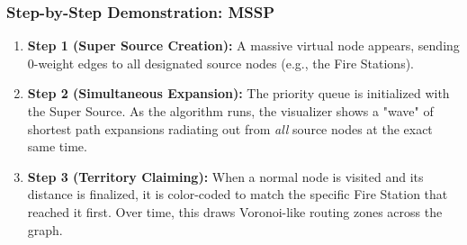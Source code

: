 \subsubsection{Step-by-Step Demonstration: MSSP}
\begin{enumerate}
    \item \textbf{Step 1 (Super Source Creation):} A massive virtual node appears, sending 0-weight edges to all designated source nodes (e.g., the Fire Stations).
    \item \textbf{Step 2 (Simultaneous Expansion):} The priority queue is initialized with the Super Source. As the algorithm runs, the visualizer shows a "wave" of shortest path expansions radiating out from \textit{all} source nodes at the exact same time.
    \item \textbf{Step 3 (Territory Claiming):} When a normal node is visited and its distance is finalized, it is color-coded to match the specific Fire Station that reached it first. Over time, this draws Voronoi-like routing zones across the graph.
\end{enumerate}